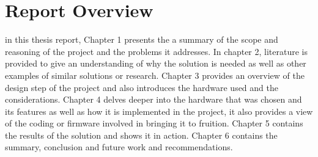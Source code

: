 \section{Report Overview}%

in this thesis report, Chapter 1 presents the a summary of the scope and reasoning of  the project and the problems it addresses. In chapter 2, literature is provided to give an understanding of why the solution is needed as well as other examples of similar solutions or research. Chapter 3 provides an overview of the design step of the project and also introduces the hardware used and the considerations. Chapter 4 delves deeper into the hardware that was chosen and its features as well as how it is implemented in the project, it also provides a view of the coding or firmware involved in bringing it to fruition. Chapter 5 contains the results of the solution and shows it in action. Chapter 6 contains the summary, conclusion and future work and recommendations.






